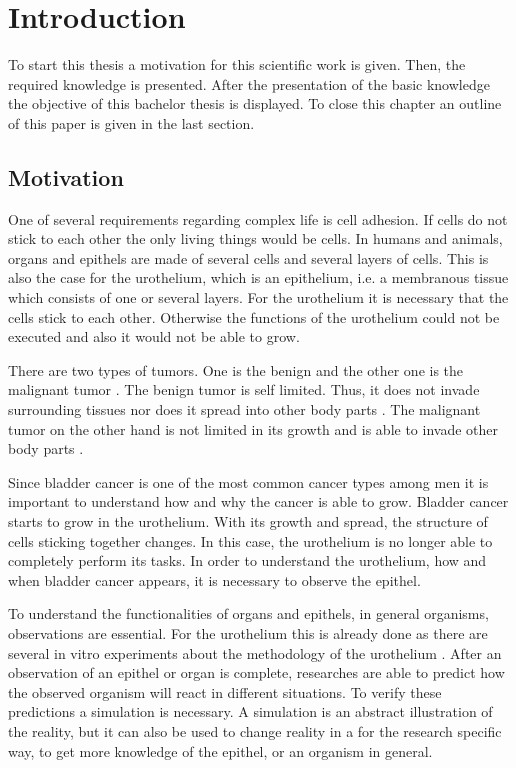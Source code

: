 \chapter{Introduction}
To start this thesis a motivation for this scientific work is given. Then, the required knowledge is presented. After the presentation of the basic knowledge the objective of this bachelor thesis is displayed. To close this chapter an outline of this paper is given in the last section.

\section{Motivation}
One of several requirements regarding complex life is cell adhesion. If cells do not stick to each other the only living things would be cells. 
In humans and animals, organs and epithels are made of several cells and several layers of cells. This is also the case for the urothelium, which is an epithelium, i.e. a membranous tissue which consists of one or several layers. For the urothelium it is necessary that the cells stick to each other. Otherwise the functions of the urothelium could not be executed and also it would not be able to grow.

There are two types of tumors. One is the benign and the other one is the malignant tumor \cite{Poplawski2009}. The benign tumor is self limited. Thus, it does not invade surrounding tissues nor does it spread into other body parts \cite{Poplawski2009}. The malignant tumor on the other hand is not limited in its growth and is able to invade other body parts \cite{Poplawski2009}. 

Since bladder cancer is one of the most common cancer types among men it is important to understand how and why the cancer is able to grow. \newline
Bladder cancer starts to grow in the urothelium. With its growth and spread, the structure of cells sticking together changes. In this case, the urothelium is no longer able to completely perform its tasks. In order to understand the urothelium, how and when bladder cancer appears, it is necessary to observe the epithel.

To understand the functionalities of organs and epithels, in general organisms, observations are essential. For the urothelium this is already done as there are several in vitro experiments about the methodology of the urothelium \cite{WRCross2005, PuneetKhandelwal2009}. After an observation of an epithel or organ is complete, researches are able to predict how the observed organism will react in different situations. To verify these predictions a simulation is necessary. A simulation is an abstract illustration of the reality, but it can also be used to change reality in a for the research specific way, to get more knowledge of the epithel, or an organism in general.

